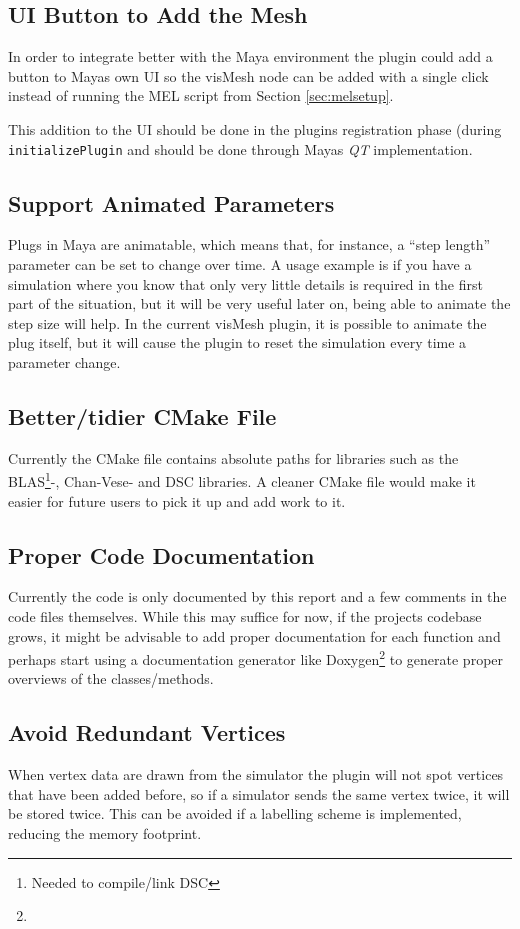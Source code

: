 \subsection{UI Button to Add the Mesh}
In order to integrate better with the Maya environment the plugin could add a
button to Mayas own UI so the visMesh node can be added with a single click
instead of running the MEL script from Section \ref{sec:melsetup}.

This addition to the UI should be done in the plugins registration phase (during
\texttt{initializePlugin} and should be done through Mayas \textit{QT}
implementation.

\subsection{Support Animated Parameters}
Plugs in Maya are animatable, which means that, for instance, a ``step length''
parameter can be set to change over time. A usage example is if you have a
simulation where you know that only very little details is required in the first
part of the situation, but it will be very useful later on, being able to
animate the step size will help. In the current visMesh plugin, it is possible
to animate the plug itself, but it will cause the plugin to reset the simulation
every time a parameter change.

\subsection{Better/tidier CMake File}
Currently the CMake file contains absolute paths for libraries such as the
BLAS\footnote{Needed to compile/link DSC}-, Chan-Vese- and DSC libraries. A
cleaner CMake file would make it easier for future users to pick it up and add
work to it.

\subsection{Proper Code Documentation}
Currently the code is only documented by this report and a few comments in the
code files themselves. While this may suffice for now, if the projects codebase
grows, it might be advisable to add proper documentation for each function and
perhaps start using a documentation generator like Doxygen\footnote{
} to generate proper overviews of
the classes/methods.

\subsection{Avoid Redundant Vertices}
When vertex data are drawn from the simulator the plugin will not spot vertices
that have been added before, so if a simulator sends the same vertex twice, it
will be stored twice. This can be avoided if a labelling scheme is implemented,
reducing the memory footprint.

